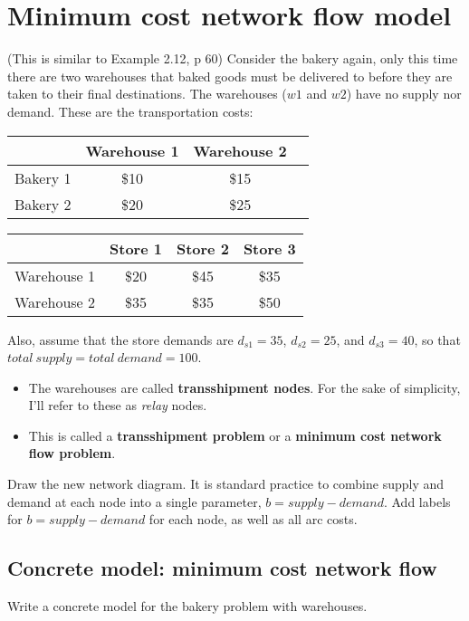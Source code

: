 \documentclass[11pt]{article}
\theoremstyle{definition}
\begin{document}
\newpage
\section{Minimum cost network flow model}
(This is similar to Example 2.12, p 60) Consider the bakery again, only this time there are two warehouses that baked goods must be delivered to before they are taken to their final destinations.  The warehouses ($w1$ and $w2$) have no supply nor demand.  These are the transportation costs:

\begin{center}
\begin{tabular}{|c|c|c|c|}
\hline
& Warehouse 1 & Warehouse 2 \\
\hline
Bakery 1 & \$10 & \$15 \\
\hline
Bakery 2 & \$20 & \$25 \\
\hline
\end{tabular}
\begin{tabular}{|c|c|c|c|}
\hline
& Store 1 & Store 2 & Store 3 \\
\hline
Warehouse 1 & \$20 & \$45 & \$35 \\
\hline
Warehouse 2 & \$35 & \$35 & \$50 \\
\hline
\end{tabular}
\end{center}
Also, assume that the store demands are $d_{s1} = 35$, $d_{s2} = 25$, and $d_{s3} = 40$, so that $total~supply = total~demand = 100$.
\begin{itemize}
\item The warehouses are called \textbf{transshipment nodes}. For the sake of simplicity, I'll refer to these as \emph{relay} nodes.  
\item This is called a \textbf{transshipment problem} or a \textbf{minimum cost network flow problem}.
\end{itemize}

Draw the new network diagram.  It is standard practice to combine supply and demand at each node into a single parameter, $b = supply - demand$.  Add labels for $b = supply - demand$ for each node, as well as all arc costs. 
\vfill 


\subsection{Concrete model: minimum cost network flow}
Write a concrete model for the bakery problem with warehouses.
\vfill \vfill
\end{document}
